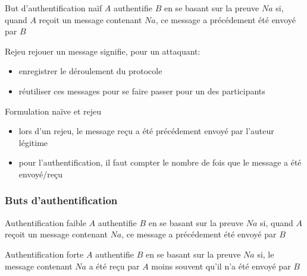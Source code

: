 \begin{reveals}
\begin{frame}
  \vfill

   \begin{block}{But d'authentification naïf}
     \(A\) authentifie \(B\) en se basant sur la preuve \(Na\) si,
     quand \(A\) reçoit un message contenant \(Na\), ce message a
     précédement été envoyé par \(B\)
   \end{block}

  \vfill

  \begin{block}{Rejeu}
    rejouer un message signifie, pour un attaquant:
    \begin{itemize}
    \item enregistrer le déroulement du protocole
    \item réutiliser ces messages pour se faire passer pour un des
      participants
    \end{itemize}
  \end{block}

  \vfill

  \begin{block}{Formulation naïve et rejeu}
    \begin{itemize}
    \item lors d'un rejeu, le message reçu a été précédement envoyé
      par l'auteur légitime
    \item pour l'authentification, il faut compter le nombre de fois
      que le message a été envoyé/reçu
    \end{itemize}
  \end{block}

  \vfill

\end{frame}

\begin{frame}
  \frametitle{Buts d'authentification}

  \vfill

   \begin{block}{Authentification faible}
     \(A\) authentifie \(B\) en se basant sur la preuve \(Na\) si,
     quand \(A\) reçoit un message contenant \(Na\), ce message a
     précédement été envoyé par \(B\)    
  \end{block}

  \vfill

   \begin{block}{Authentification forte}
     \(A\) authentifie \(B\) en se basant sur la preuve \(Na\) si, le
     message contenant \(Na\) a été reçu par \(A\) moins souvent qu'il
     n'a été envoyé par \(B\)
  \end{block}


\end{frame}
\end{reveals}
